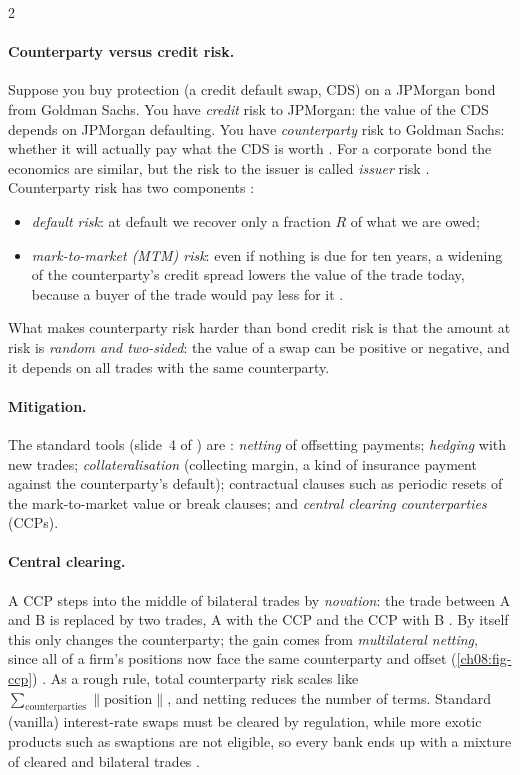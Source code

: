 \begin{paracol}{2}
\paragraph{Counterparty versus credit risk.} Suppose you buy protection (a credit default swap, CDS) on a
JPMorgan bond from Goldman Sachs. You have \emph{credit} risk to JPMorgan: the value of the CDS depends on
JPMorgan defaulting. You have \emph{counterparty} risk to Goldman Sachs: whether it will actually pay what the
CDS is worth . For a corporate bond the economics are similar, but the risk to the issuer
is called \emph{issuer} risk . Counterparty risk has two components :
\begin{itemize}
  \item \emph{default risk}: at default we recover only a fraction $R$ of what we are owed;
  \item \emph{mark-to-market (MTM) risk}: even if nothing is due for ten years, a widening of the
        counterparty's credit spread lowers the value of the trade today, because a buyer of the trade would
        pay less for it .
\end{itemize}
What makes counterparty risk harder than bond credit risk is that the amount at risk is \emph{random and
two-sided}: the value of a swap can be positive or negative, and it depends on all trades with the same
counterparty.

\paragraph{Mitigation.} The standard tools (slide~4 of ) are : \emph{netting}
of offsetting payments; \emph{hedging} with new trades; \emph{collateralisation} (collecting margin, a kind of
insurance payment against the counterparty's default); contractual clauses such as periodic resets of the
mark-to-market value or break clauses; and \emph{central clearing counterparties} (CCPs).

\paragraph{Central clearing.} A CCP steps into the middle of bilateral trades by \emph{novation}: the trade
between A and B is replaced by two trades, A with the CCP and the CCP with B . By itself
this only changes the counterparty; the gain comes from \emph{multilateral netting}, since all of a firm's
positions now face the same counterparty and offset (\cref{ch08:fig-ccp}) . As a rough
rule, total counterparty risk scales like $\sum_{\text{counterparties}}\|\text{position}\|$, and netting reduces
the number of terms. Standard (vanilla) interest-rate swaps must be cleared by regulation, while more exotic
products such as swaptions are not eligible, so every bank ends up with a mixture of cleared and bilateral
trades .


\end{paracol}
